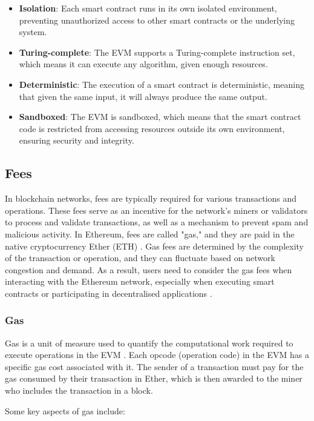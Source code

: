 \begin{itemize}
\item \textbf{Isolation}: Each smart contract runs in its own isolated environment, preventing unauthorized access to other smart contracts or the underlying system.
\item \textbf{Turing-complete}: The EVM supports a Turing-complete instruction set, which means it can execute any algorithm, given enough resources.
\item \textbf{Deterministic}: The execution of a smart contract is deterministic, meaning that given the same input, it will always produce the same output.
\item \textbf{Sandboxed}: The EVM is sandboxed, which means that the smart contract code is restricted from accessing resources outside its own environment, ensuring security and integrity.
\end{itemize}

\subsection{Fees}
In blockchain networks, fees are typically required for various transactions and operations. These fees serve as an incentive for the network's miners or validators to process and validate transactions, as well as a mechanism to prevent spam and malicious activity. In Ethereum, fees are called "gas," and they are paid in the native cryptocurrency Ether (ETH) \cite{wood2014ethereum}. Gas fees are determined by the complexity of the transaction or operation, and they can fluctuate based on network congestion and demand. As a result, users need to consider the gas fees when interacting with the Ethereum network, especially when executing smart contracts or participating in decentralised applications \cite{wood2014ethereum}.

\subsubsection{Gas}
Gas is a unit of measure used to quantify the computational work required to execute operations in the EVM \cite{wood2014ethereum}. Each opcode (operation code) in the EVM has a specific gas cost associated with it. The sender of a transaction must pay for the gas consumed by their transaction in Ether, which is then awarded to the miner who includes the transaction in a block.

Some key aspects of gas include:

